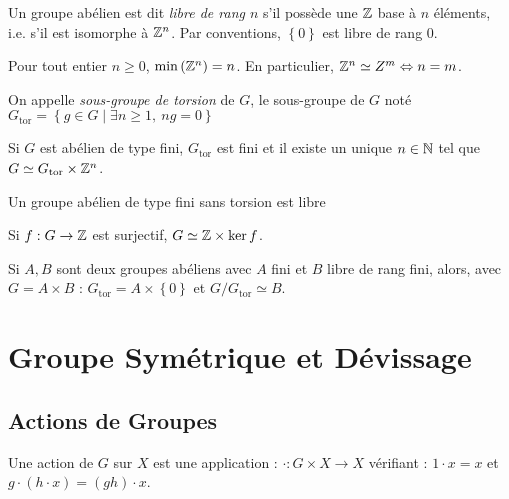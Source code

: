 \documentclass{cours}
\begin{document}
\begin{definition}
    Un groupe abélien est dit \emph{libre de rang $n$} s'il possède une $\mathbb{Z}$ base à $n$ éléments, i.e. s'il est isomorphe à $\mathbb{Z}^{n}$. Par conventions, $\left\{0\right\}$ est libre de rang $0$.
\end{definition}

\begin{lemma}
    Pour tout entier $n\geq 0$, $\min{\left(\mathbb{Z}^{n}\right)} = n$. En particulier, $\mathbb{Z}^{n} \simeq Z^{m} \Leftrightarrow n = m$.
\end{lemma}

\begin{definition}
    On appelle \emph{sous-groupe de torsion} de $G$, le sous-groupe de $G$ noté $G_{\text{tor}} =\left\{g \in G \mid \exists n \geq 1, \ ng = 0\right\}$
\end{definition}

\begin{theorem}[Dirichlet]
    Si $G$ est abélien de type fini, $G_{\text{tor}}$ est fini et il existe un unique $n \in \mathbb{N}$ tel que $G \simeq G_{\text{tor}} \times \mathbb{Z}^{n}$.
\end{theorem}

\begin{corollary}
    Un groupe abélien de type fini sans torsion est libre
\end{corollary}

\begin{lemma}
    Si $f:  G \rightarrow \mathbb{Z}$ est surjectif, $G \simeq \mathbb{Z} \times \ker f$.
\end{lemma}

\begin{lemma}
    Si $A, B$ sont deux groupes abéliens avec $A$ fini et $B$ libre de rang fini, alors, avec $G = A\times B$ : $G_{\text{tor}} = A \times \left\{0\right\}$ et $G/G_{\text{tor}} \simeq B$.
\end{lemma}

\newpage
\section{Groupe Symétrique et Dévissage}
\subsection{Actions de Groupes}
\begin{definition}
    Une action de $G$ sur $X$ est une application :
    $\cdot : G \times X \rightarrow X$ vérifiant :
    $ 1\cdot x = x$ et $g \cdot \left(h \cdot x\right) = (gh) \cdot x$.
\end{definition}
\end{document}
